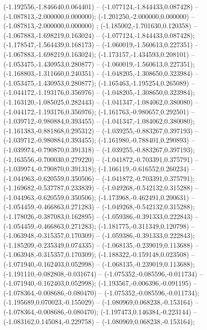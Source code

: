  (-1.192556,-1.846640,0.064401) -- (-1.077124,-1.844433,0.087428) -- (-1.087813,-2.000000,0.000000);
 (-1.201250,-2.000000,0.000000) -- (-1.087813,-2.000000,0.000000) ;
 (-1.185002,-1.701630,0.120358) -- (-1.067883,-1.698219,0.163024) -- (-1.077124,-1.844433,0.087428);
 (-1.178547,-1.564439,0.168173) -- (-1.060019,-1.560613,0.227351) -- (-1.067883,-1.698219,0.163024);
 (-1.173157,-1.434593,0.208101) -- (-1.053475,-1.430953,0.280877) -- (-1.060019,-1.560613,0.227351);
 (-1.168803,-1.311660,0.240351) -- (-1.048205,-1.308650,0.323984) -- (-1.053475,-1.430953,0.280877);
 (-1.165463,-1.195254,0.265089) -- (-1.044172,-1.193176,0.356976) -- (-1.048205,-1.308650,0.323984);
 (-1.163120,-1.085025,0.282443) -- (-1.041347,-1.084062,0.380080) -- (-1.044172,-1.193176,0.356976);
 (-1.161763,-0.980657,0.292501) -- (-1.039712,-0.980884,0.393455) -- (-1.041347,-1.084062,0.380080);
 (-1.161383,-0.881868,0.295312) -- (-1.039255,-0.883267,0.397193) -- (-1.039712,-0.980884,0.393455);
 (-1.161980,-0.788401,0.290893) -- (-1.039974,-0.790870,0.391318) -- (-1.039255,-0.883267,0.397193);
 (-1.163556,-0.700030,0.279220) -- (-1.041872,-0.703391,0.375791) -- (-1.039974,-0.790870,0.391318);
 (-1.166119,-0.616552,0.260234) -- (-1.044963,-0.620559,0.350506) -- (-1.041872,-0.703391,0.375791);
 (-1.169682,-0.537787,0.233839) -- (-1.049268,-0.542132,0.315288) -- (-1.044963,-0.620559,0.350506);
 (-1.173968,-0.462491,0.200631) -- (-1.054459,-0.466863,0.271283) -- (-1.049268,-0.542132,0.315288);
 (-1.178026,-0.387083,0.162895) -- (-1.059386,-0.391333,0.222843) -- (-1.054459,-0.466863,0.271283);
 (-1.181775,-0.311349,0.120798) -- (-1.063948,-0.315357,0.170309) -- (-1.059386,-0.391333,0.222843);
 (-1.185209,-0.235349,0.074335) -- (-1.068135,-0.239019,0.113688) -- (-1.063948,-0.315357,0.170309);
 (-1.188322,-0.159148,0.023508) -- (-1.071940,-0.162403,0.052998) -- (-1.068135,-0.239019,0.113688);
 (-1.191110,-0.082808,-0.031674) -- (-1.075352,-0.085596,-0.011734) -- (-1.071940,-0.162403,0.052998);
 (-1.193567,-0.006396,-0.091195) -- (-1.078364,-0.008686,-0.080470) -- (-1.075352,-0.085596,-0.011734);
 (-1.195689,0.070023,-0.155029) -- (-1.080969,0.068238,-0.153164) -- (-1.078364,-0.008686,-0.080470);
 (-1.197473,0.146384,-0.223144) -- (-1.083162,0.145084,-0.229758) -- (-1.080969,0.068238,-0.153164);
